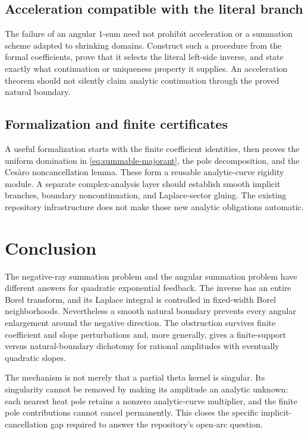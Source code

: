 \documentclass[11pt,a4paper]{article}
\numberwithin{equation}{section}
\theoremstyle{definition}
\theoremstyle{remark}
\begin{document}
\subsection{Acceleration compatible with the literal branch}
The failure of an angular $1$-sum need not prohibit acceleration or a
summation scheme adapted to shrinking domains.  Construct such a
procedure from the formal coefficients, prove that it selects the
literal left-side inverse, and state exactly what continuation or
uniqueness property it supplies.  An acceleration theorem should not
silently claim analytic continuation through the proved natural
boundary.

\subsection{Formalization and finite certificates}
A useful formalization starts with the finite coefficient identities,
then proves the uniform domination in
\eqref{eq:summable-majorant}, the pole decomposition, and the Ces\`aro
noncancellation lemma.  These form a reusable analytic-curve rigidity
module.  A separate complex-analysis layer should establish smooth
implicit branches, boundary noncontinuation, and Laplace-sector gluing.
The existing repository infrastructure does not make those new analytic
obligations automatic.

\section{Conclusion}
The negative-ray summation problem and the angular summation problem
have different answers for quadratic exponential feedback.  The inverse
has an entire Borel transform, and its Laplace integral is controlled in
fixed-width Borel neighborhoods.  Nevertheless a smooth natural boundary
prevents every angular enlargement around the negative direction.
The obstruction survives finite coefficient and slope perturbations and,
more generally, gives a finite-support versus natural-boundary dichotomy
for rational amplitudes with eventually quadratic slopes.

The mechanism is not merely that a partial theta kernel is singular.
Its singularity cannot be removed by making its amplitude an analytic
unknown: each nearest heat pole retains a nonzero analytic-curve
multiplier, and the finite pole contributions cannot cancel permanently.
This closes the specific implicit-cancellation gap required to answer
the repository's open-arc question.
\end{document}
